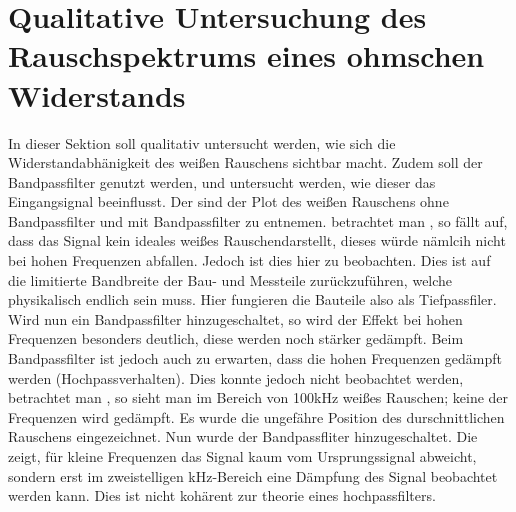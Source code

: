 \newpage

\section{Qualitative Untersuchung des Rauschspektrums eines ohmschen Widerstands}
\label{sec:A1}
In dieser Sektion soll qualitativ untersucht werden, wie sich die Widerstandabhänigkeit des weißen Rauschens sichtbar macht. Zudem soll der Bandpassfilter genutzt werden, und untersucht werden, wie dieser das Eingangsignal beeinflusst.
Der  sind  der Plot des weißen Rauschens ohne Bandpassfilter und  mit Bandpassfilter zu entnemen.
betrachtet man , so fällt auf, dass das Signal kein ideales weißes Rauschendarstellt, dieses würde nämlcih nicht bei hohen Frequenzen abfallen. Jedoch ist dies hier zu beobachten. Dies ist auf die limitierte Bandbreite der Bau- und Messteile zurückzuführen, welche physikalisch endlich sein muss. Hier fungieren die Bauteile also als Tiefpassfiler.
Wird nun ein Bandpassfilter hinzugeschaltet, so wird der Effekt bei hohen Frequenzen besonders deutlich, diese werden noch stärker gedämpft. Beim Bandpassfilter ist jedoch auch zu erwarten, dass die hohen Frequenzen gedämpft werden (Hochpassverhalten). Dies konnte jedoch nicht beobachtet werden, betrachtet man , so sieht man im Bereich von 100kHz weißes Rauschen; keine der Frequenzen wird gedämpft. Es wurde die ungefähre Position des durschnittlichen Rauschens eingezeichnet. 
Nun wurde der Bandpassfliter hinzugeschaltet. Die  zeigt, für kleine Frequenzen das Signal kaum vom Ursprungssignal abweicht, sondern erst im zweistelligen kHz-Bereich eine Dämpfung des Signal beobachtet werden kann. Dies ist nicht kohärent zur theorie eines hochpassfilters.

